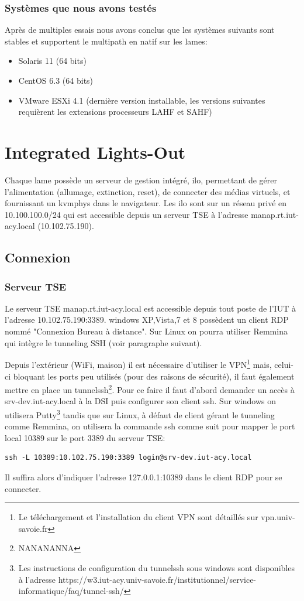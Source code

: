 \documentclass[a4paper,oneside]{report}
\begin{document}
\subsubsection{Systèmes que nous avons testés}
Après de multiples essais nous avons conclus que les systèmes suivants sont stables et supportent le multipath en natif sur les lames:
\begin{itemize}
\item Solaris 11 (64 bits)
\item CentOS 6.3 (64 bits)
\item VMware ESXi 4.1 (dernière version installable, les versions suivantes requièrent les extensions processeurs LAHF et SAHF)
\end{itemize}

\section{Integrated Lights-Out}
Chaque lame possède un serveur de gestion intégré, \gls{ilo}, permettant de gérer l'alimentation (allumage, extinction, reset), de connecter des médias virtuels, et fournissant un \gls{kvmphys} dans le navigateur.
Les \gls{ilo} sont sur un réseau privé en 10.100.100.0/24 qui est accessible depuis un serveur TSE à l'adresse manap.rt.iut-acy.local (10.102.75.190).

\subsection{Connexion}
\subsubsection{Serveur TSE}
Le serveur TSE manap.rt.iut-acy.local est accessible depuis tout poste de l'IUT à l'adresse 10.102.75.190:3389. \gls{windows} XP,Vista,7 et 8 possèdent un client RDP nommé "Connexion Bureau à distance". Sur Linux on pourra utiliser Remmina qui intègre le tunneling SSH (voir paragraphe suivant).


Depuis l'extérieur (WiFi, maison) il est nécessaire d'utiliser le VPN\footnote{Le téléchargement et l'installation du client VPN sont détaillés sur vpn.univ-savoie.fr} mais, celui-ci bloquant les ports peu utilisés (pour des raisons de sécurité), il faut également mettre en place un \gls{tunnelssh}\footnote{NANANANNA}.
Pour ce faire il faut d'abord demander un accès à srv-dev.iut-acy.local à la DSI puis configurer son client \gls{ssh}.\newline
Sur \gls{windows} on utilisera Putty\footnote{Les instructions de configuration du \gls{tunnelssh} sous \gls{windows} sont disponibles à l'adresse https://w3.iut-acy.univ-savoie.fr/institutionnel/service-informatique/faq/tunnel-ssh/} tandis que sur Linux, à défaut de client gérant le tunneling comme Remmina, on utilisera la commande ssh comme suit pour mapper le port local 10389 sur le port 3389 du serveur TSE:
\label{tunnelingSsh}
\begin{verbatim}
ssh -L 10389:10.102.75.190:3389 login@srv-dev.iut-acy.local
\end{verbatim}
Il suffira alors d'indiquer l'adresse 127.0.0.1:10389 dans le client RDP pour se connecter.
\end{document}
